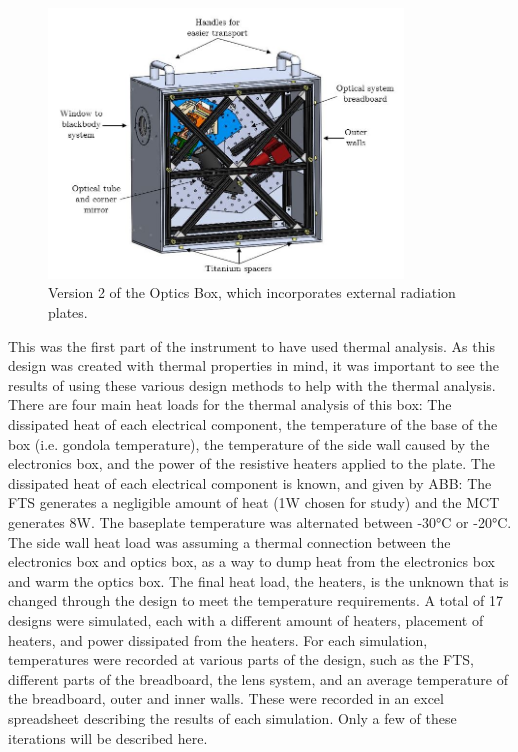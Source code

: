 \begin{figure}
    \centering
    \includegraphics[width=0.84\textwidth]{chap3_images/LIFE_V2_images/Optics_Box_V1_labelled.JPG}
    \caption{Version 2 of the Optics Box, which incorporates external radiation plates.}
    \label{fig:OB_V2}
\end{figure}

This was the first part of the instrument to have used thermal analysis. As this design was created with thermal properties in mind, it was important to see the results of using these various design methods to help with the thermal analysis. There are four main heat loads for the thermal analysis of this box: The dissipated heat of each electrical component, the temperature of the base of the box (i.e. gondola temperature), the temperature of the side wall caused by the electronics box, and the power of the resistive heaters applied to the plate. The dissipated heat of each electrical component is known, and given by ABB: The FTS generates a negligible amount of heat (1W chosen for study) and the MCT generates 8W. The baseplate temperature was alternated between -30°C or -20°C. The side wall heat load was assuming a thermal connection between the electronics box and optics box, as a way to dump heat from the electronics box and warm the optics box. The final heat load, the heaters, is the unknown that is changed through the design to meet the temperature requirements. A total of 17 designs were simulated, each with a different amount of heaters, placement of heaters, and power dissipated from the heaters. For each simulation, temperatures were recorded at various parts of the design, such as the FTS, different parts of the breadboard, the lens system, and an average temperature of the breadboard, outer and inner walls. These were recorded in an excel spreadsheet describing the results of each simulation. Only a few of these iterations will be described here.%


